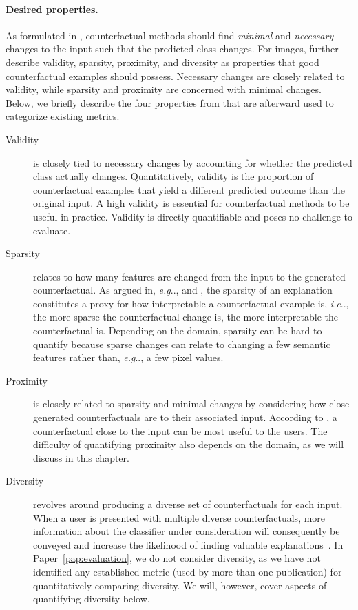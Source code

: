 \documentclass[11pt,a4paper,twoside,openright,final]{memoir}
\makeatletter
\DeclareRobustCommand\onedot{\futurelet\@let@token\@onedot}
\def\@onedot{\ifx\@let@token.\else.\null\fi\xspace}
\def\eg{\emph{e.g}\onedot} \def\Eg{\emph{E.g}\onedot}
\def\ie{\emph{i.e}\onedot} \def\Ie{\emph{I.e}\onedot}
\newcommand*{\paperref}[1]{Paper~\hyperref[#1]{\ref{#1}}}
\makeatother
\begin{document}
\paragraph{Desired properties.}
As formulated in \citet{Wachter2017}, counterfactual methods should find \emph{minimal} and \emph{necessary} changes to the input such that the predicted class changes.
For images, \citet{Mothilal2020} further describe validity, sparsity, proximity, and diversity as properties that good counterfactual examples should possess.
Necessary changes are closely related to validity, while sparsity and proximity are concerned with minimal changes. 
Below, we briefly describe the four properties from \cite{Mothilal2020} that are afterward used to categorize existing metrics.

\begin{description} 
    \item[Validity] is closely tied to necessary changes by accounting for whether the predicted class actually changes. 
    Quantitatively, validity is the proportion of counterfactual examples that yield a different predicted outcome than the original input.
    A high validity is essential for counterfactual methods to be useful in practice.
    Validity is directly quantifiable and poses no challenge to evaluate.
    
    \item[Sparsity] relates to how many features are changed from the input to the generated counterfactual.
    As argued in, \eg, \cite{Wachter2017} and \cite{Grath2018}, the sparsity of an explanation constitutes a proxy for how interpretable a counterfactual example is, \ie, the more sparse the counterfactual change is, the more interpretable the counterfactual is. 
    Depending on the domain, sparsity can be hard to quantify because sparse changes can relate to changing a few semantic features rather than, \eg, a few pixel values.
    
    \item[Proximity] is closely related to sparsity and minimal changes by considering how close generated counterfactuals are to their associated input.
    According to \citet{Mothilal2020}, a counterfactual close to the input can be most useful to the users.
    The difficulty of quantifying proximity also depends on the domain, as we will discuss in this chapter. 
    
    \item[Diversity] revolves around producing a diverse set of counterfactuals for each input.
    When a user is presented with multiple diverse counterfactuals, more information about the classifier under consideration will consequently be conveyed and increase the likelihood of finding valuable explanations~\cite{Rodriguez2021}.
    In \paperref{pap:evaluation}, we do not consider diversity, as we have not identified any established metric (used by more than one publication) for quantitatively comparing diversity.
    We will, however, cover aspects of quantifying diversity below.
\end{description}
\end{document}
